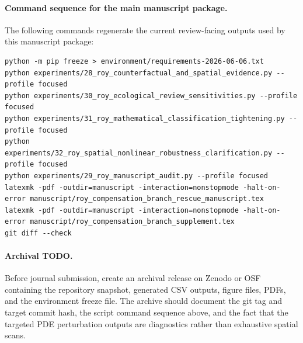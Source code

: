 \documentclass[11pt]{article}
\begin{document}
\paragraph{Command sequence for the main manuscript package.}
The following commands regenerate the current review-facing outputs used by this manuscript package:
\begin{verbatim}
python -m pip freeze > environment/requirements-2026-06-06.txt
python experiments/28_roy_counterfactual_and_spatial_evidence.py --profile focused
python experiments/30_roy_ecological_review_sensitivities.py --profile focused
python experiments/31_roy_mathematical_classification_tightening.py --profile focused
python experiments/32_roy_spatial_nonlinear_robustness_clarification.py --profile focused
python experiments/29_roy_manuscript_audit.py --profile focused
latexmk -pdf -outdir=manuscript -interaction=nonstopmode -halt-on-error manuscript/roy_compensation_branch_rescue_manuscript.tex
latexmk -pdf -outdir=manuscript -interaction=nonstopmode -halt-on-error manuscript/roy_compensation_branch_supplement.tex
git diff --check
\end{verbatim}

\paragraph{Archival TODO.}
Before journal submission, create an archival release on Zenodo or OSF containing the repository snapshot, generated CSV outputs, figure files, PDFs, and the environment freeze file. The archive should document the git tag and target commit hash, the script command sequence above, and the fact that the targeted PDE perturbation outputs are diagnostics rather than exhaustive spatial scans.
\end{document}
